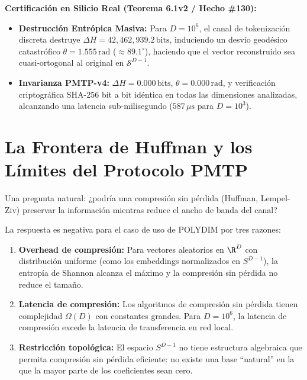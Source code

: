 \begin{certifiedbox}
\textbf{Certificación en Silicio Real (Teorema 6.1v2 / Hecho \#130):}
\begin{itemize}
    \item \textbf{Destrucción Entrópica Masiva:} Para $D = 10^6$, el canal de tokenización discreta destruye $\Delta H = 42{,}462{,}939.2\,\text{bits}$, induciendo un desvío geodésico catastrófico $\theta = 1.555\,\text{rad}$ ($\approx 89.1^\circ$), haciendo que el vector reconstruido sea cuasi-ortogonal al original en $\mathcal{S}^{D-1}$.
    \item \textbf{Invarianza PMTP-v4:} $\Delta H = 0.000\,\text{bits}$, $\theta = 0.000\,\text{rad}$, y verificación criptográfica SHA-256 bit a bit idéntica en todas las dimensiones analizadas, alcanzando una latencia sub-milisegundo ($587\,\mu\text{s}$ para $D=10^3$).
\end{itemize}
\end{certifiedbox}

\section{La Frontera de Huffman y los Límites del Protocolo PMTP}

Una pregunta natural: ¿podría una compresión sin pérdida (Huffman, Lempel-Ziv)
preservar la información mientras reduce el ancho de banda del canal?

La respuesta es negativa para el caso de uso de POLYDIM por tres razones:

\begin{enumerate}
\item \textbf{Overhead de compresión:} Para vectores aleatorios en $\R^D$ con
distribución uniforme (como los embeddings normalizados en $S^{D-1}$), la entropía
de Shannon alcanza el máximo y la compresión sin pérdida no reduce el tamaño.

\item \textbf{Latencia de compresión:} Los algoritmos de compresión sin pérdida
tienen complejidad $\Omega(D)$ con constantes grandes. Para $D = 10^6$, la
latencia de compresión excede la latencia de transferencia en red local.

\item \textbf{Restricción topológica:} El espacio $S^{D-1}$ no tiene estructura
algebraica que permita compresión sin pérdida eficiente: no existe una base
``natural'' en la que la mayor parte de los coeficientes sean cero.
\end{enumerate}

